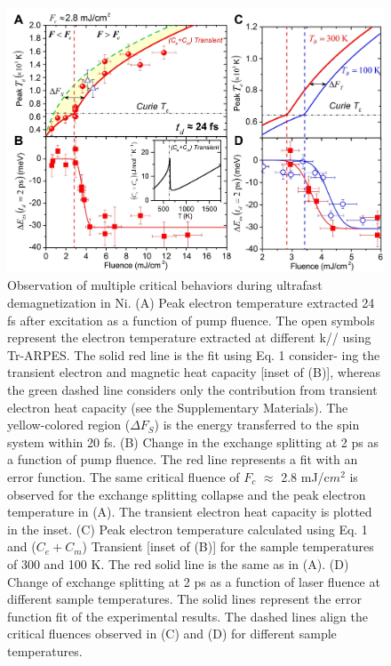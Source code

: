 \begin{figure}[htbp]
	\begin{center}
		\includegraphics[width=150mm]{aap9744_Figure_fig4_seq4_v1.pdf}
	\end{center}
	\caption{Observation of multiple critical behaviors during ultrafast demagnetization in Ni. (A) Peak electron temperature extracted 24 fs after excitation as a function of pump fluence. The open symbols represent the electron temperature extracted at different k// using Tr-ARPES. The solid red line is the fit using Eq. 1 consider- ing the transient electron and magnetic heat capacity [inset of (B)], whereas the green dashed line considers only the contribution from transient electron heat capacity (see the Supplementary Materials). The yellow-colored region ($\Delta F_{S}$) is the energy transferred to the spin system within 20 fs. (B) Change in the exchange splitting at 2 ps as a function of pump fluence. The red line represents a fit with an error function. The same critical fluence of $F_{c}$ $\approx$ 2.8 mJ/c$m^2$ is observed for the exchange splitting collapse and the peak electron temperature in (A). The transient electron heat capacity is plotted in the inset. (C) Peak electron temperature calculated using Eq. 1 and ($C_{e} + C_{m}$) Transient [inset of (B)] for the sample temperatures of 300 and 100 K. The red solid line is the same as in (A). (D) Change of exchange splitting at 2 ps as a function of laser fluence at different sample temperatures. The solid lines represent the error function fit of the experimental results. The dashed lines align the critical fluences observed in (C) and (D) for different sample temperatures.}
	\label{fig: Nifig4}
\end{figure}

